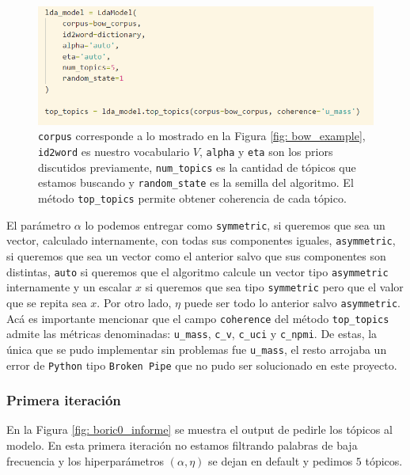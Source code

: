 \documentclass{article}
\begin{document}
	\begin{figure}[H]
		\centering
		\includegraphics[scale=.4]{../imgs/gensim_code_informe.png}
		\caption{\texttt{corpus} corresponde a lo mostrado en la Figura \ref{fig: bow_example}, \texttt{id2word} es nuestro vocabulario $V$, \texttt{alpha} y \texttt{eta} son los priors discutidos previamente, \texttt{num\_topics} es la cantidad de tópicos que estamos buscando y \texttt{random\_state} es la semilla del algoritmo. El método \texttt{top\_topics} permite obtener coherencia de cada tópico.}
		\label{fig: gensim_code_informe}
	\end{figure}
	El parámetro $\alpha$ lo podemos entregar como \texttt{symmetric}, si queremos que sea un vector, calculado internamente, con todas sus componentes iguales, \texttt{asymmetric}, si queremos que sea un vector como el anterior salvo que sus componentes son distintas, \texttt{auto} si queremos que el algoritmo calcule un vector tipo \texttt{asymmetric} internamente y un escalar $x$ si queremos que sea tipo \texttt{symmetric} pero que el valor que se repita sea $x$. Por otro lado, $\eta$ puede ser todo lo anterior salvo \texttt{asymmetric}. Acá es importante mencionar que el campo \texttt{coherence} del método \texttt{top\_topics} admite las métricas denominadas: \texttt{u\_mass}, \texttt{c\_v}, \texttt{c\_uci} y \texttt{c\_npmi}. De estas, la única que se pudo implementar sin problemas fue \texttt{u\_mass}, el resto arrojaba un error de \texttt{Python} tipo \texttt{Broken Pipe} que no pudo ser solucionado en este proyecto.
	
	\subsubsection{Primera iteración}
	 En la Figura \ref{fig: boric0_informe} se muestra el output de pedirle los tópicos al modelo. En esta primera iteración no estamos filtrando palabras de baja frecuencia y los hiperparámetros $(\alpha, \eta)$ se dejan en default y pedimos $5$ tópicos. 
	
\end{document}
